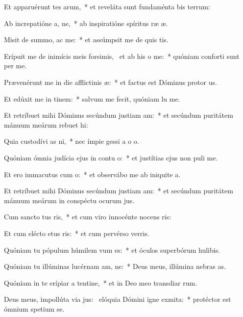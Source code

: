 \item Et apparuérunt tes arum,~* et reveláta sunt fundaménta bis terrum:
\item Ab increpatióne a, ne,~* ab inspiratióne spíritus ræ æ.
\item Misit de summo,  ac me:~* et assúmpsit me de quis tis.
\item Erípuit me de inimícis meis forsimis,~\pscross{} et ab his  o me:~* quóniam conforti sunt per me.
\item Prævenérunt me in die afflictinis æ:~* et factus est Dóminus protor us.
\item Et edúxit me in tinem:~* salvum me fecit, quóniam lu me.
\item Et retríbuet mihi Dóminus secúndum justiam am:~* et secúndum puritátem mánuum meárum rebuet hi:
\item Quia custodívi as ni,~* nec ímpie gessi a o o.
\item Quóniam ómnia judícia ejus in contu o:~* et justítias ejus non puli  me.
\item Et ero immacutus cum o:~* et observábo me ab iniquite a.
\item Et retríbuet mihi Dóminus secúndum justiam am:~* et secúndum puritátem mánuum meárum in conspéctu ocurum jus.
\item Cum sancto tus ris,~* et cum viro innocénte nocens ris:
\item Et cum elécto etus ris:~* et cum pervérso verris.
\item Quóniam tu pópulum húmilem vum es:~* et óculos superbórum hulibis.
\item Quóniam tu illúminas lucérnam am, ne:~* Deus meus, illúmina nebras as.
\item Quóniam in te erípiar a tentine,~* et in Deo meo transdiar rum.
\item Deus meus, impollúta via jus:~\pscross{} elóquia Dómini igne exmita:~* protéctor est ómnium spetium  se.
